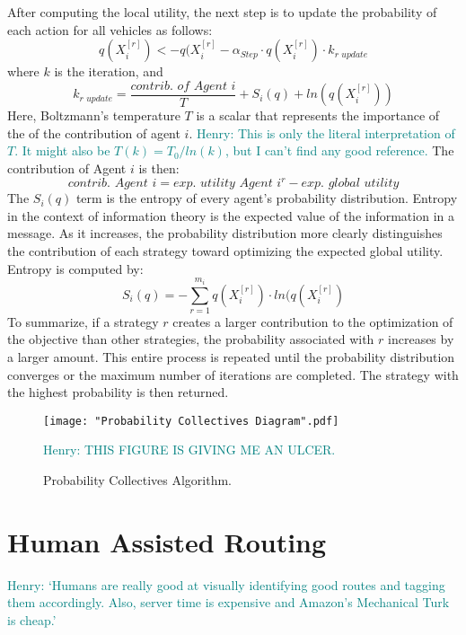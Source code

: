 \documentclass{sig-alternate}
\newcommand{\allcomments}[1]{{#1}}
\newcommand{\hfcomment}[1]{\textcolor{Teal}{\allcomments{Henry: {#1}}}}
\begin{document}
After computing the local utility, the next step is to update the probability of each action for all vehicles as follows:
	\begin{equation}
	q(X_i^{[r]})<-q(X_i^{[r]}-\alpha_{Step}\cdot q(X_i^{[r]})\cdot k_{\textit{r update}}
	\end{equation}
where $k$ is the iteration, and
	\begin{equation}
	k_{\textit{r update}} = \dfrac{\textit{contrib. of Agent }i}{T}+S_i(q)+ln(q(X_i^{[r]}))
	\end{equation}
Here, Boltzmann's temperature $T$  is a scalar that represents the importance of the of the contribution of agent $i$.
\hfcomment{This is only the literal interpretation of $T$. It might also be $T(k)=T_0/ln(k)$, but I can't find any good reference.}
The contribution of Agent $i$ is then:
	\begin{equation}
	\textit{contrib. Agent }i = \textit{exp. utility Agent }i^r - \textit{exp. global utility}
	\end{equation}	
The $S_i(q)$ term is the entropy  of every agent's probability distribution. Entropy in the context of information theory is the expected value of the information in a message. As it increases, the probability distribution more clearly distinguishes the contribution of each strategy toward optimizing the expected global utility. Entropy is computed by:
	\begin{equation}
	S_i(q)=-\sum_{r=1}^{m_i}q(X_i^{[r]})\cdot ln(q(X_i^{[r]})
	\end{equation}
To summarize, if a strategy $r$ creates a larger contribution to the optimization of the objective than other strategies, the probability associated with $r$ increases by a larger amount. This entire process is repeated until the probability distribution converges or the maximum number of iterations are completed. The strategy with the highest probability is then returned. 

\begin{figure}
\centering
\texttt{[image: "Probability Collectives Diagram".pdf]}
\caption{Probability Collectives Algorithm.}
\hfcomment{THIS FIGURE IS GIVING ME AN ULCER.}
\label{fig:PCDiagram}
\end{figure}

\section{Human Assisted Routing}
\label{sec:humans}
\hfcomment{`Humans are really good at visually identifying good routes and tagging them accordingly. Also, server time is expensive and Amazon's Mechanical Turk is cheap.'}
\end{document}
